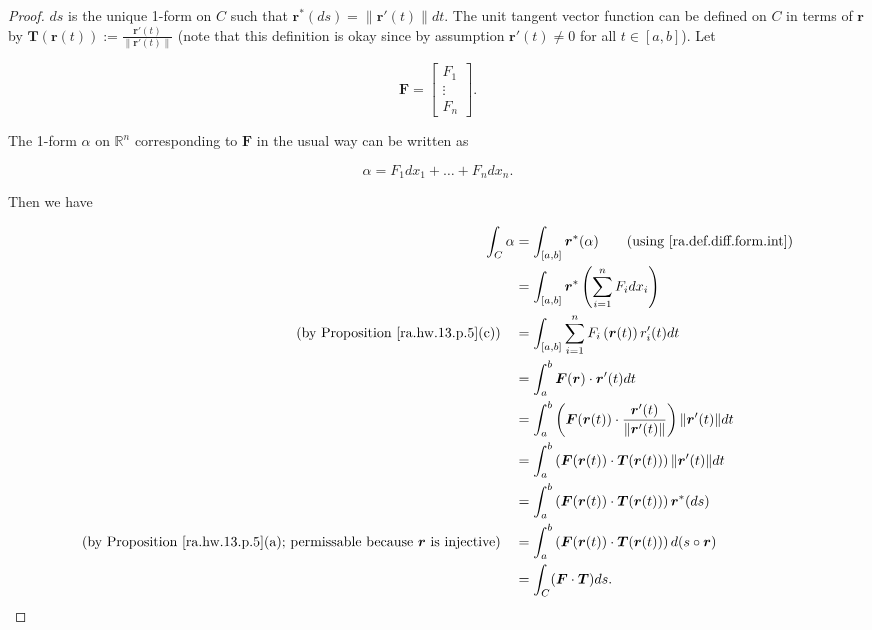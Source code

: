 \begin{proof}

\(ds\) is the unique 1-form on \(C\) such that \(\boldsymbol{r}^* (ds) = \lVert \boldsymbol{r}' (t)\rVert dt\). The unit tangent vector function can be defined on \(C\) in terms of \(\boldsymbol{r}\) by \(\boldsymbol{T}(\boldsymbol{r}(t)) := \frac{ \boldsymbol{r}'(t)}{\lVert  \boldsymbol{r}'(t) \rVert}\) (note that this definition is okay since by assumption \(\boldsymbol{r}'(t) \neq 0\) for all \(t \in [a,b]\)). Let



 

\[
\boldsymbol{F} = \begin{bmatrix} F_1 \\ \vdots \\ F_n \end{bmatrix}.
\]

The 1-form \(\alpha\) on \(\mathbb{R}^n\) corresponding to \(\boldsymbol{F}\) in the usual way can be written as 

\[
\alpha = F_1 dx_1 + \ldots + F_n dx_n.
\]

Then we have

\begin{align*}
\int_C \alpha & =  \int_{[a,b]} \boldsymbol{r}^*(\alpha) \qquad \text{(using \eqref{ra.def.diff.form.int})} 
\\ & =  \int_{[a,b]} \boldsymbol{r}^*\left(  \sum_{i=1}^n F_i dx_i \right) 
\\   \text{(by Proposition \ref{ra.hw.13.p.5}(c))} \quad & =  \int_{[a,b]} \sum_{i=1}^n F_i \left( \boldsymbol{r}(t) \right) r_i'(t) dt  
\\ & = \int_a^b \boldsymbol{F}(\boldsymbol{r}) \cdot \boldsymbol{r}'(t) dt  
\\ & = \int_a^b \left( \boldsymbol{F}(\boldsymbol{r}(t)) \cdot \frac{ \boldsymbol{r}'(t)}{\lVert  \boldsymbol{r}'(t) \rVert} \right) \lVert \boldsymbol{r}'(t) \rVert dt 
\\ & = \int_a^b \left( \boldsymbol{F}(\boldsymbol{r}(t)) \cdot \boldsymbol{T}(\boldsymbol{r}(t)) \right) \lVert \boldsymbol{r}'(t) \rVert dt 
\\ & = \int_a^b \left( \boldsymbol{F}(\boldsymbol{r}(t)) \cdot \boldsymbol{T}(\boldsymbol{r}(t)) \right) \boldsymbol{r}^* (ds)
\\ \text{(by Proposition \ref{ra.hw.13.p.5}(a); permissable because \(\boldsymbol{r}\) is injective)} \quad & = \int_a^b \left( \boldsymbol{F}(\boldsymbol{r}(t)) \cdot \boldsymbol{T}(\boldsymbol{r}(t)) \right) d(s \circ \boldsymbol{r})
\\ & = \int_C (\boldsymbol{F} \cdot \boldsymbol{T}) ds.
\end{align*}


\end{proof}

